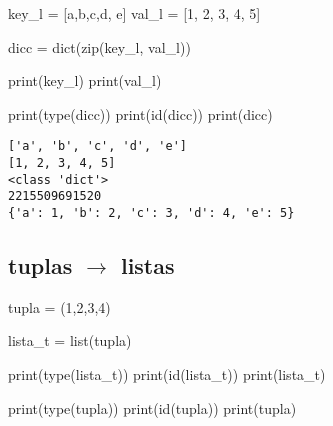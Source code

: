 \documentclass[
  letterpaper,
  DIV=11,
  numbers=noendperiod]{scrreprt}
\newenvironment{Shaded}{\begin{snugshade}}{\end{snugshade}}
\newcommand{\BuiltInTok}[1]{\textcolor[rgb]{0.00,0.23,0.31}{#1}}
\newcommand{\DecValTok}[1]{\textcolor[rgb]{0.68,0.00,0.00}{#1}}
\newcommand{\NormalTok}[1]{\textcolor[rgb]{0.00,0.23,0.31}{#1}}
\newcommand{\OperatorTok}[1]{\textcolor[rgb]{0.37,0.37,0.37}{#1}}
\newcommand{\StringTok}[1]{\textcolor[rgb]{0.13,0.47,0.30}{#1}}
\begin{document}
\begin{Shaded}
\begin{Highlighting}[]
\NormalTok{key\_l }\OperatorTok{=}\NormalTok{ [}\StringTok{\textquotesingle{}a\textquotesingle{}}\NormalTok{,}\StringTok{\textquotesingle{}b\textquotesingle{}}\NormalTok{,}\StringTok{\textquotesingle{}c\textquotesingle{}}\NormalTok{,}\StringTok{\textquotesingle{}d\textquotesingle{}}\NormalTok{, }\StringTok{\textquotesingle{}e\textquotesingle{}}\NormalTok{]}
\NormalTok{val\_l }\OperatorTok{=}\NormalTok{ [}\DecValTok{1}\NormalTok{, }\DecValTok{2}\NormalTok{, }\DecValTok{3}\NormalTok{, }\DecValTok{4}\NormalTok{, }\DecValTok{5}\NormalTok{]}
\end{Highlighting}
\end{Shaded}

\begin{Shaded}
\begin{Highlighting}[]
\NormalTok{dicc }\OperatorTok{=} \BuiltInTok{dict}\NormalTok{(}\BuiltInTok{zip}\NormalTok{(key\_l, val\_l))}

\BuiltInTok{print}\NormalTok{(key\_l)}
\BuiltInTok{print}\NormalTok{(val\_l)}

\BuiltInTok{print}\NormalTok{(}\BuiltInTok{type}\NormalTok{(dicc))}
\BuiltInTok{print}\NormalTok{(}\BuiltInTok{id}\NormalTok{(dicc))}
\BuiltInTok{print}\NormalTok{(dicc)}
\end{Highlighting}
\end{Shaded}

\begin{verbatim}
['a', 'b', 'c', 'd', 'e']
[1, 2, 3, 4, 5]
<class 'dict'>
2215509691520
{'a': 1, 'b': 2, 'c': 3, 'd': 4, 'e': 5}
\end{verbatim}

\subsection{\texorpdfstring{tuplas \(\to\)
listas}{tuplas \textbackslash to listas}}\label{tuplas-to-listas}

\begin{Shaded}
\begin{Highlighting}[]
\NormalTok{tupla }\OperatorTok{=}\NormalTok{ (}\DecValTok{1}\NormalTok{,}\DecValTok{2}\NormalTok{,}\DecValTok{3}\NormalTok{,}\DecValTok{4}\NormalTok{)}
\end{Highlighting}
\end{Shaded}

\begin{Shaded}
\begin{Highlighting}[]
\NormalTok{lista\_t }\OperatorTok{=} \BuiltInTok{list}\NormalTok{(tupla)}

\BuiltInTok{print}\NormalTok{(}\BuiltInTok{type}\NormalTok{(lista\_t))}
\BuiltInTok{print}\NormalTok{(}\BuiltInTok{id}\NormalTok{(lista\_t))}
\BuiltInTok{print}\NormalTok{(lista\_t)}

\BuiltInTok{print}\NormalTok{(}\BuiltInTok{type}\NormalTok{(tupla))}
\BuiltInTok{print}\NormalTok{(}\BuiltInTok{id}\NormalTok{(tupla))}
\BuiltInTok{print}\NormalTok{(tupla)}
\end{Highlighting}
\end{Shaded}
\end{document}
